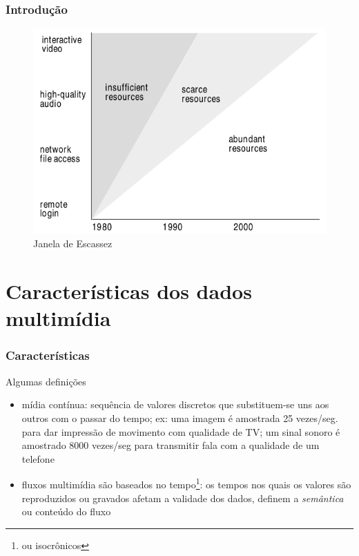 \documentclass[]{beamer}
\begin{document}
\begin{frame}
  \frametitle{Introdução}
  \begin{figure}[hbtp]
   \caption{Janela de Escassez}
   \begin{center}
    \includegraphics[scale=0.33]{janela_escassez.png}
   \end{center}
  \end{figure}
\end{frame}

\section{Características dos dados multimídia}

\begin{frame}
  \frametitle{Características}
Algumas definições
\begin{itemize}
  \item mídia contínua: sequência de valores discretos que substituem-se uns aos outros
com o passar do tempo; ex: uma imagem é amostrada 25 vezes/seg. para 
dar impressão de movimento com qualidade de TV; um sinal sonoro é amostrado
8000 vezes/seg para transmitir fala com a qualidade de um telefone
  \item fluxos multimídia são baseados no tempo\footnote{ou isocrônicos}: os tempos nos quais
os valores são reproduzidos ou gravados afetam a validade dos dados, definem 
a \emph{semântica} ou conteúdo do fluxo
  
\end{itemize}
\end{frame}
\end{document}
